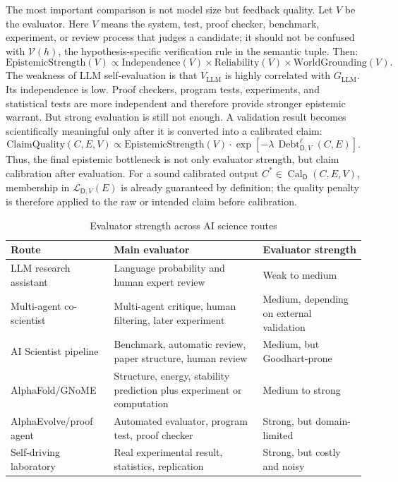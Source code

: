 \documentclass[11pt,a4paper]{article}
\newcommand{\Cal}{\operatorname{Cal}}
\newcommand{\Debt}{\operatorname{Debt}}
\newcommand{\Dom}{\mathsf{D}}
\begin{document}
The most important comparison is not model size but feedback quality. Let $V$ be the evaluator. Here $V$ means the system, test, proof checker, benchmark, experiment, or review process that judges a candidate; it should not be confused with $\mathcal{V}(h)$, the hypothesis-specific verification rule in the semantic tuple. Then:
\begin{equation}
\mathrm{EpistemicStrength}(V)\propto
\mathrm{Independence}(V)\times
\mathrm{Reliability}(V)\times
\mathrm{WorldGrounding}(V).
\end{equation}
The weakness of LLM self-evaluation is that $V_{\mathrm{LLM}}$ is highly correlated with $G_{\mathrm{LLM}}$. Its independence is low. Proof checkers, program tests, experiments, and statistical tests are more independent and therefore provide stronger epistemic warrant. But strong evaluation is still not enough. A validation result becomes scientifically meaningful only after it is converted into a calibrated claim:
\begin{equation}
\mathrm{ClaimQuality}(C,E,V)\propto
\mathrm{EpistemicStrength}(V)\cdot
\exp[-\lambda\,\Debt^\ell_{\Dom,V}(C,E)].
\end{equation}
Thus, the final epistemic bottleneck is not only evaluator strength, but claim calibration after evaluation. For a sound calibrated output $C^\ast\in\Cal_{\Dom}(C,E,V)$, membership in $\mathcal{L}_{\Dom,V}(E)$ is already guaranteed by definition; the quality penalty is therefore applied to the raw or intended claim before calibration.

\begin{table}[htbp]
\centering
\small
\caption{Evaluator strength across AI science routes}
\begin{tabularx}{\textwidth}{@{}p{3.2cm}Y p{2.8cm}@{}}
\toprule
Route & Main evaluator & Evaluator strength \\
\midrule
LLM research assistant & Language probability and human expert review & Weak to medium \\
Multi-agent co-scientist & Multi-agent critique, human filtering, later experiment & Medium, depending on external validation \\
AI Scientist pipeline & Benchmark, automatic review, paper structure, human review & Medium, but Goodhart-prone \\
AlphaFold/GNoME & Structure, energy, stability prediction plus experiment or computation & Medium to strong \\
AlphaEvolve/proof agent & Automated evaluator, program test, proof checker & Strong, but domain-limited \\
Self-driving laboratory & Real experimental result, statistics, replication & Strong, but costly and noisy \\
\bottomrule
\end{tabularx}
\end{table}
\end{document}
